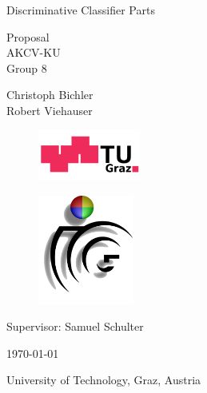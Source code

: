 \documentclass[11pt,ngerman,a4paper]{article}
\begin{document}
\begin{titlepage}

\begin{center}
\begin{Huge}
Discriminative Classifier Parts \\
\end{Huge}
\vspace{4mm}
\begin{Large}
Proposal \\ AKCV-KU \\
\vspace{10mm}
Group 8
\end{Large}

\vspace{20mm}


\begin{Large}
Christoph Bichler \\
Robert Viehauser \\
\end{Large}
\vspace{10mm}

\end{center}

\begin{figure}[ht!]\centering
\includegraphics[width = 0.3\textwidth]{figures/logo_tu_graz.png}
\end{figure}
\vspace{5mm}
\begin{figure}[ht!]\centering
\includegraphics[width = 0.28\textwidth]{figures/icg_logo.png}
\end{figure}
\vspace{15mm}

\begin{Large}\centering
Supervisor: Samuel Schulter\\
\end{Large}
\vspace{10mm}

\begin{center}\centering
\today
\end{center}

\begin{center}
University of Technology, Graz, Austria
\end{center}


\newpage

\end{titlepage}

\setcounter{page}{1}




\end{document}
